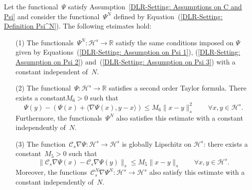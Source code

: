 \begin{lemma}\autocite[Lemma 2.4]{Pillai2012}
\label{DLR-Seeting: Lemma: Properties of Psi and Psi^N}
 Let the functional~$\Psi$ satisfy Assumption~\ref{DLR-Setting: Assumptions on C and Psi} and consider the functional~$\Psi^N$ defined by Equation~(\ref{DLR-Setting: Definition Psi^N}). The following etsimates hold:
 \begin{enumerate}
  \item[(1)] The functionals~$\Psi^N : \mathcal{H}^s \to \mathbb{R}$ satisfy the same conditions imposed on $\Psi$ given by Equations~(\ref{DLR-Setting: Assumption on Psi 1}), (\ref{DLR-Setting: Assumption on Psi 2}) and~(\ref{DLR-Setting: Assumption on Psi 3}) with a constant independent of~$N$.
  \item[(2)]  The functional~$\Psi: \mathcal{H}^s \to \mathbb{R}$ satisfies a second order Taylor formula. There exists a constant$M_6 >0$ such that
  \begin{equation}
  \label{DLR-Setting: Psi Taylor formula}
   \Psi(y) - \left( \Psi(x) + \langle \nabla \Psi(x), y-x \rangle \right) \leq M_6 \|x-y\|_s^2 \qquad \forall x,y \in \mathcal{H}^s. 
  \end{equation}
  Furthermore, the functionals~$\Psi^N$ also satisfies this estimate with a constant independently of~$N$.
  \item[(3)] The function~$\mathcal{C}_s\nabla \Psi: \mathcal{H}^s \to \mathcal{H}^s$ is globally Lipschitz on $\mathcal{H}^s$: there exists a constant~$M_5>0$ such that
  \begin{equation*}
   \| \mathcal{C}_s\nabla \Psi (x) - \mathcal{C}_s\nabla \Psi (y) \|_s \leq M_5 \|x - y \|_s \qquad \forall x,y \in \mathcal{H}^s.
  \end{equation*}
  Moreover, the functions~$\mathcal{C}_s^N\nabla \Psi^N: \mathcal{H}^s \to \mathcal{H}^s$ also satisfy this estimate with a constant independently of~$N$.
 \end{enumerate}

\end{lemma}

